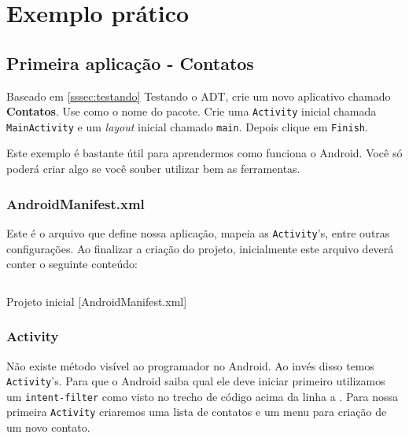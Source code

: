 \chapter{Exemplo prático}

\section{Primeira aplicação - Contatos}

% 
Baseado em \ref{sssec:testando} Testando o ADT, crie um novo aplicativo chamado \textbf{Contatos}. Use
 como o nome do pacote. Crie uma \texttt{Activity} inicial chamada
\texttt{MainActivity} e um \textit{layout} inicial chamado \texttt{main}. Depois clique em
\texttt{Finish}.

Este exemplo é bastante útil para aprendermos como funciona o Android. Você
só poderá criar algo se você souber utilizar bem as ferramentas.

\subsection{AndroidManifest.xml}

Este é o arquivo que define nossa aplicação, mapeia as \texttt{Activity}'s, entre outras configurações. Ao finalizar
a criação do projeto, inicialmente este arquivo deverá conter o seguinte conteúdo:

\begin{listing}[H]
  \inputminted[linenos=true,frame=bottomline,tabsize=3]{ xml }{ source/AndroidManifest-1.xml }
  \caption{Projeto inicial [AndroidManifest.xml]}
\end{listing}

\subsection{Activity\label{ssec:act}}

Não existe método  visível ao programador no Android. Ao invés disso temos \texttt{Activity}'s.
Para que o Android saiba qual ele deve iniciar primeiro utilizamos um \texttt{intent-filter} como visto
no trecho de código acima da linha  a .
Para nossa primeira \texttt{Activity} criaremos uma lista de contatos e um menu para criação de um novo contato.

